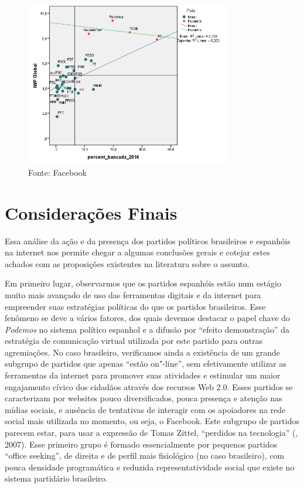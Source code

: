 \begin{figure}[!ht]
\centering
 \includegraphics[width=90mm]{./imgs/graf2.png}
\caption{Fonte: Facebook}
\end{figure}

\section{Considerações Finais}

Essa análise da ação e da presença dos partidos políticos brasileiros e
espanhóis na internet nos permite chegar a algumas conclusões gerais e
cotejar estes achados com as proposições existentes na literatura sobre
o assunto.

Em primeiro lugar, observarmos que os partidos espanhóis estão num
estágio muito mais avançado de uso das ferramentas digitais e da
internet para empreender suas estratégias políticas do que os partidos
brasileiros. Esse fenômeno se deve a vários fatores, dos quais devemos
destacar o papel chave do \emph{Podemos} no sistema político espanhol e
a difusão por ``efeito demonstração'' da estratégia de comunicação
virtual utilizada por este partido para outras agremiações. No caso
brasileiro, verificamos ainda a existência de um grande subgrupo de
partidos que apenas ``estão on"-line'', sem efetivamente utilizar as
ferramentas da internet para promover suas atividades e estimular um
maior engajamento cívico dos cidadãos através dos recursos Web 2.0.
Esses partidos se caracterizam por websites pouco diversificados, pouca
presença e atenção nas mídias sociais, e ausência de tentativas de
interagir com os apoiadores na rede social mais utilizada no momento, ou
seja, o Facebook. Este subgrupo de partidos parecem estar, para usar a
expressão de Tomas Zittel, ``perdidos na tecnologia'' (, 2007).
Esse primeiro grupo é formado essencialmente por pequenos partidos
``office seeking'', de direita e de perfil mais fisiológico (no caso
brasileiro), com pouca densidade programática e reduzida
representatividade social que existe no sistema partidário brasileiro.

